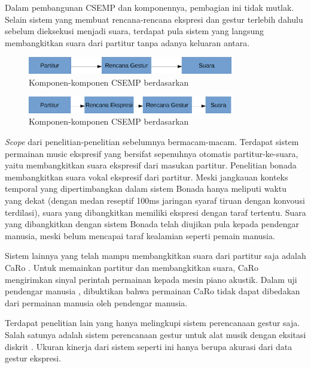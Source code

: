 Dalam pembangunan CSEMP dan komponennya, pembagian ini tidak mutlak. Selain sistem yang membuat rencana-rencana ekspresi dan gestur terlebih dahulu sebelum dieksekusi menjadi suara, terdapat pula sistem yang langsung membangkitkan suara dari partitur tanpa adanya keluaran antara.

\begin{figure}[h]
    \centering
    \includegraphics[width=0.8\textwidth]{resources/CSEMP-Components-Thippur.eps}
    \caption{Komponen-komponen CSEMP berdasarkan \citet{Thippur2013ProbabilisticMO}} \label{thippurcomponents}
\end{figure}

\begin{figure}[h]
    \centering
    \includegraphics[width=0.8\textwidth]{resources/CSEMP-Components-Yu.eps}
    \caption{Komponen-komponen CSEMP berdasarkan \citet{yu2017bowing}}\label{yucomponents}
\end{figure}

\textit{Scope} dari penelitian-penelitian sebelumnya bermacam-macam. Terdapat sistem permainan music ekspresif yang bersifat sepenuhnya otomatis partitur-ke-suara, yaitu membangkitkan suara ekspresif dari masukan partitur. Penelitian bonada \parencite{bonada2017singing} membangkitkan suara vokal ekspresif dari partitur. Meski jangkauan konteks temporal yang dipertimbangkan dalam sistem Bonada hanya meliputi waktu yang dekat (dengan medan reseptif 100ms jaringan syaraf tiruan dengan konvousi terdilasi), suara yang dibangkitkan memiliki ekspresi dengan taraf tertentu. Suara yang dibangkitkan dengan sistem Bonada telah diujikan pula kepada pendengar manusia, meski belum mencapai taraf kealamian seperti pemain manusia.

Sistem lainnya yang telah mampu membangkitkan suara dari partitur saja adalah CaRo \parencite{canazza2015}. Untuk memainkan partitur dan membangkitkan suara, CaRo mengirimkan sinyal perintah permainan kepada mesin piano akustik. Dalam uji pendengar manusia \parencite{schubert2017test}, dibuktikan bahwa permainan CaRo tidak dapat dibedakan dari permainan manusia oleh pendengar manusia.

Terdapat penelitian lain yang hanya melingkupi sistem perencanaan gestur saja. Salah satunya adalah sistem perencanaan gestur untuk alat musik dengan eksitasi diskrit \parencite{miranda2010}. Ukuran kinerja dari sistem seperti ini hanya berupa akurasi dari data gestur ekspresi.

